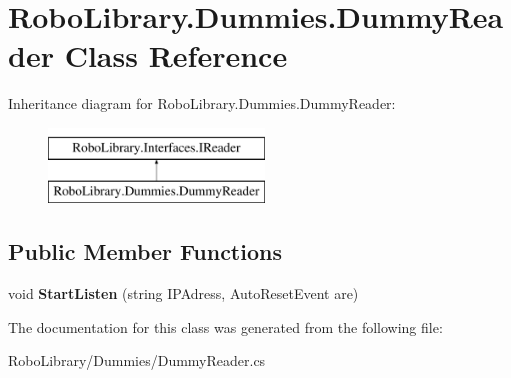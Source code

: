 \hypertarget{class_robo_library_1_1_dummies_1_1_dummy_reader}{}\section{Robo\+Library.\+Dummies.\+Dummy\+Reader Class Reference}
\label{class_robo_library_1_1_dummies_1_1_dummy_reader}
Inheritance diagram for Robo\+Library.\+Dummies.\+Dummy\+Reader\+:\begin{figure}[H]
\begin{center}
\leavevmode
\includegraphics[height=2.000000cm]{class_robo_library_1_1_dummies_1_1_dummy_reader}
\end{center}
\end{figure}
\subsection*{Public Member Functions}
\begin{DoxyCompactItemize}
\item 
\hypertarget{class_robo_library_1_1_dummies_1_1_dummy_reader_ad0dbf81053f910ebf2651df522ab6b0c}{}\label{class_robo_library_1_1_dummies_1_1_dummy_reader_ad0dbf81053f910ebf2651df522ab6b0c} 
void {\bfseries Start\+Listen} (string I\+P\+Adress, Auto\+Reset\+Event are)
\end{DoxyCompactItemize}


The documentation for this class was generated from the following file\+:\begin{DoxyCompactItemize}
\item 
Robo\+Library/\+Dummies/Dummy\+Reader.\+cs\end{DoxyCompactItemize}
